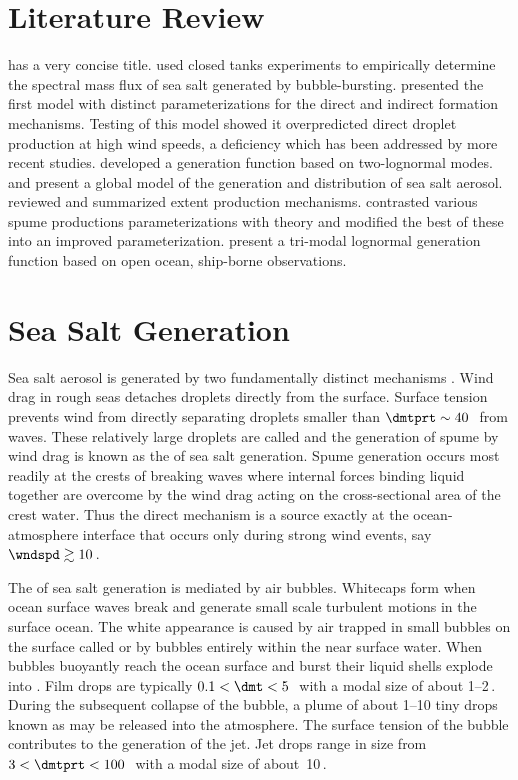 \documentclass[12pt,twoside]{book}
\begin{document}
\section[Literature Review]{Literature Review}\label{sxn:ssl_ltr}
\cite{Mon71} has a very concise title.
\cite{MDS82} used closed tanks experiments to empirically determine
the spectral mass flux of sea salt generated by bubble-bursting.
\cite{MSD86} presented the first model with distinct parameterizations
for the direct and indirect formation mechanisms.
Testing of this model showed it overpredicted direct droplet
production at high wind speeds, a deficiency which has been addressed
by more recent studies.
\cite{SPC93} developed a generation function based on two-lognormal
modes.
\cite{GBB97} and \cite{GBP97} present a global model of the generation
and distribution of sea salt aerosol.
\cite{AEM95} reviewed and summarized extent production mechanisms.
\cite{And98} contrasted various spume productions parameterizations
with theory and modified the best of these into an improved
parameterization. 
\cite{VDB01} present a tri-modal lognormal generation function based
on open ocean, ship-borne observations.

\section[Sea Salt Generation]{Sea Salt Generation}\label{sxn:ssl_mbl}
Sea salt aerosol is generated by two fundamentally distinct
mechanisms \cite[e.g.,][]{MSD86}.
Wind drag in rough seas detaches droplets directly from the surface.
Surface tension prevents wind from directly separating droplets
smaller than $\dmtprt \sim 40$\,\um\ from waves.
These relatively large droplets are called  and
the generation of spume by wind drag is known as the  of sea salt generation.
Spume generation occurs most readily at the crests of breaking waves 
where internal forces binding liquid together are overcome by the
wind drag acting on the cross-sectional area of the crest water.
Thus the direct mechanism is a source exactly at the ocean-atmosphere
interface that occurs only during strong wind events, say $\wndspd
\gtrsim 10$\,\mxs.

The  of sea salt generation is mediated
by air bubbles.
Whitecaps form when ocean surface waves break and generate small scale
turbulent motions in the surface ocean. 
The white appearance is caused by air trapped in small bubbles on the
surface called  or by bubbles entirely within the near
surface water. 
When bubbles buoyantly reach the ocean surface and burst their liquid
shells explode into . 
Film drops are typically $0.1 < \dmt < 5$\,\um\ with a modal size of
about 1--2\,\um. 
During the subsequent collapse of the bubble, a plume of about 1--10
tiny drops known as  may be released into the
atmosphere.
The surface tension of the bubble contributes to the generation of the
jet. 
Jet drops range in size from $3 < \dmtprt < 100$\,\um\ with a modal
size of about~10\,\um. 
\end{document}
